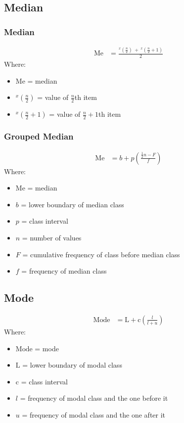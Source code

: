 \documentclass[12pt,titlepage]{article}
\begin{document}
\subsection{Median}
\subsubsection{Median}
\begin{align*}
    \text{Me} &= \frac{^x(\frac{n}{2})~+~^x(\frac{n}{2}+1)}{2}
\end{align*}
Where:
\begin{itemize}
    \item $\text{Me}$ = median
    \item $^x(\frac{n}{2})$ = value of $\frac{n}{2}$th item
    \item $^x(\frac{n}{2}+1)$ = value of $\frac{n}{2}+1$th item
\end{itemize}

\subsubsection{Grouped Median}
\begin{align*}
    \text{Me} &= b + p \left( \frac{\frac{1}{2}n - F}{f} \right)
\end{align*}
Where:
\begin{itemize}
    \item $\text{Me}$ = median
    \item $b$ = lower boundary of median class
    \item $p$ = class interval
    \item $n$ = number of values
    \item $F$ = cumulative frequency of class before median class
    \item $f$ = frequency of median class
\end{itemize}

\subsection{Mode}
\begin{align*}
    \text{Mode} &= \text{L} + \text{c} \left( \frac{l}{l+u} \right)
\end{align*}
Where:
\begin{itemize}
    \item $\text{Mode}$ = mode
    \item $\text{L}$ = lower boundary of modal class
    \item $\text{c}$ = class interval
    \item $l$ = frequency of modal class and the one before it
    \item $u$ = frequency of modal class and the one after it
\end{itemize}
\end{document}
